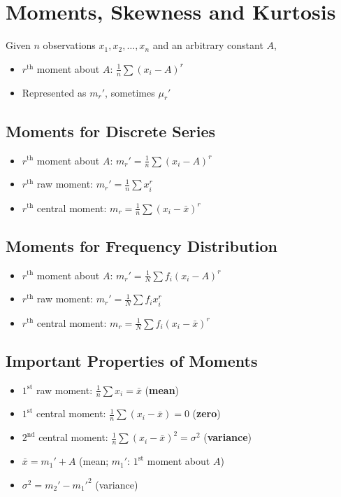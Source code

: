 \section*{Moments, Skewness and Kurtosis}

Given $n$ observations $x_1, x_2, \dots, x_n$ and an arbitrary constant $A$, 
\begin{itemize}
    \item $r^\text{th}$ moment about $A$: $\frac{1}{n} \sum(x_i - A)^r$
    \item Represented as $m_r'$, sometimes $\mu_r'$
\end{itemize}

\subsection*{Moments for Discrete Series}
\begin{itemize}
    \item $r^\text{th}$ moment about $A$: $m_r' = \frac{1}{n} \sum (x_i - A)^r$
    \item $r^\text{th}$ raw moment: $m_r' = \frac{1}{n} \sum x_i^r$
    \item $r^\text{th}$ central moment: $m_r = \frac{1}{n} \sum (x_i - \bar{x})^r$
\end{itemize}

\subsection*{Moments for Frequency Distribution}
\begin{itemize}
    \item $r^\text{th}$ moment about $A$: $m_r' = \frac{1}{N} \sum f_i (x_i - A)^r$
    \item $r^\text{th}$ raw moment: $m_r' = \frac{1}{N} \sum f_i x_i^r$
    \item $r^\text{th}$ central moment: $m_r = \frac{1}{N} \sum f_i (x_i - \bar{x})^r$
\end{itemize}

\subsection*{Important Properties of Moments}
\begin{itemize}
    \item $1^\text{st}$ raw moment: $\frac{1}{n} \sum x_i = \bar{x}$ (\textbf{mean})
    \item $1^\text{st}$ central moment: $\frac{1}{n} \sum (x_i - \bar{x}) = 0$ (\textbf{zero})
    \item $2^\text{nd}$ central moment: $\frac{1}{n} \sum (x_i - \bar{x})^2 = \sigma^2$ (\textbf{variance})
    \item $\bar{x} = m_1' + A$ (mean; $m_1'$: $1^\text{st}$ moment about $A$)
    \item $\sigma^2 = m_2' - m_1'^2$ (variance)
\end{itemize}

